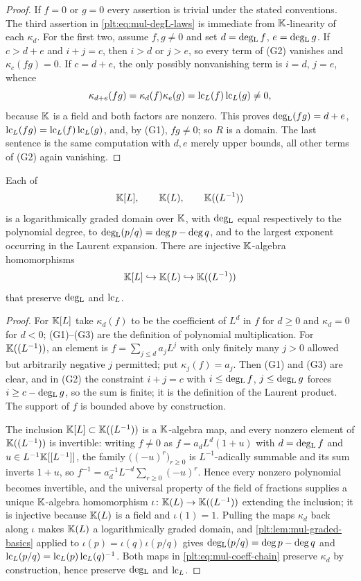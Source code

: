 \begin{proof}
If $f=0$ or $g=0$ every assertion is trivial under the stated conventions.
The third assertion in \eqref{plt:eq:mul-degL-laws} is immediate from
$\mathbb{K}$-linearity of each $\kappa_d$.  For the first two, assume $f,g\ne0$ and
set $d=\operatorname{deg_{L}} f$, $e=\operatorname{deg_{L}} g$.  If $c>d+e$ and $i+j=c$, then $i>d$ or $j>e$, so
every term of (G2) vanishes and $\kappa_c(fg)=0$.  If $c=d+e$, the only
possibly nonvanishing term is $i=d$, $j=e$, whence
\[
 \kappa_{d+e}(fg)=\kappa_d(f)\kappa_e(g)=\operatorname{lc}_L(f)\operatorname{lc}_L(g)\ne0,
\]
because $\mathbb{K}$ is a field and both factors are nonzero.  This proves
$\operatorname{deg_{L}}(fg)=d+e$, $\operatorname{lc}_L(fg)=\operatorname{lc}_L(f)\operatorname{lc}_L(g)$, and, by (G1), $fg\ne0$; so $R$
is a domain.  The last sentence is the same computation with $d,e$ merely
upper bounds, all other terms of (G2) again vanishing.
\end{proof}

\begin{lemma}
\label{plt:lem:mul-three-rings}
Each of
\[
 \mathbb{K}[L],\qquad \mathbb{K}(L),\qquad \mathbb{K}((L^{-1}))
\]
is a logarithmically graded domain over $\mathbb{K}$, with $\operatorname{deg_{L}}$ equal
respectively to the polynomial degree, to $\operatorname{deg_{L}}(p/q)=\deg p-\deg q$, and to
the largest exponent occurring in the Laurent expansion.  There are injective
$\mathbb{K}$-algebra homomorphisms
\begin{equation}\label{plt:eq:mul-coeff-chain}
 \mathbb{K}[L]\hookrightarrow\mathbb{K}(L)\hookrightarrow\mathbb{K}((L^{-1}))
\end{equation}
that preserve $\operatorname{deg_{L}}$ and $\operatorname{lc}_L$.
\end{lemma}

\begin{proof}
For $\mathbb{K}[L]$ take $\kappa_d(f)$ to be the coefficient of $L^d$ in $f$ for
$d\ge0$ and $\kappa_d=0$ for $d<0$; (G1)--(G3) are the definition of
polynomial multiplication.  For $\mathbb{K}((L^{-1}))$, an element is
$f=\sum_{j\le d}a_jL^j$ with only finitely many $j>0$ allowed but arbitrarily
negative $j$ permitted; put $\kappa_j(f)=a_j$.  Then (G1) and (G3) are clear,
and in (G2) the constraint $i+j=c$ with $i\le\operatorname{deg_{L}} f$, $j\le\operatorname{deg_{L}} g$ forces
$i\ge c-\operatorname{deg_{L}} g$, so the sum is finite; it is the definition of the Laurent
product.  The support of $f$ is bounded above by construction.

The inclusion $\mathbb{K}[L]\subset\mathbb{K}((L^{-1}))$ is a $\mathbb{K}$-algebra map, and every
nonzero element of $\mathbb{K}((L^{-1}))$ is invertible: writing $f\ne0$ as
$f=a_dL^d(1+u)$ with $d=\operatorname{deg_{L}} f$ and $u\in L^{-1}\mathbb{K}[[L^{-1}]]$, the family
$\bigl((-u)^r\bigr)_{r\ge0}$ is $L^{-1}$-adically summable and its sum
inverts $1+u$, so $f^{-1}=a_d^{-1}L^{-d}\sum_{r\ge0}(-u)^r$.  Hence
every nonzero polynomial becomes invertible, and the universal property of the
field of fractions supplies a unique $\mathbb{K}$-algebra homomorphism
$\iota\colon\mathbb{K}(L)\to\mathbb{K}((L^{-1}))$ extending the inclusion; it is injective
because $\mathbb{K}(L)$ is a field and $\iota(1)=1$.  Pulling the maps $\kappa_d$ back
along $\iota$ makes $\mathbb{K}(L)$ a logarithmically graded domain, and
\cref{plt:lem:mul-graded-basics} applied to $\iota(p)=\iota(q)\iota(p/q)$
gives $\operatorname{deg_{L}}(p/q)=\deg p-\deg q$ and
$\operatorname{lc}_L(p/q)=\operatorname{lc}_L(p)\operatorname{lc}_L(q)^{-1}$.  Both maps in
\eqref{plt:eq:mul-coeff-chain} preserve $\kappa_d$ by construction, hence
preserve $\operatorname{deg_{L}}$ and $\operatorname{lc}_L$.
\end{proof}

